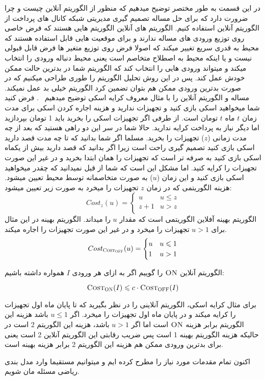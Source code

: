 در این قسمت به طور مختصر توضیح میدهیم که منظور از الگوریتم آنلاین چیست و چرا ضرورت دارد که برای حل مساله تصمیم گیری مدیریتی شبکه کانال های پرداخت از الگوریتم آنلاین استفاده کنیم. 
الگوریتم های آنلاین الگوریتم هایی هستند که فرض خاصی روی توزیع ورودی های مساله ندارند و برای موقعیت هایی قابل استفاده هستند که محیط به قدری سریع تغییر میکند که اصولا فرض روی توزیع متغیر ها فرض قابل قبولی نیست و یا اینکه محیط به اصطلاح متخاصم  است یعنی محیط دنباله ورودی را انتخاب میکند و میتواند ورودی هایی را انتخاب کند که الگوریتم شما در بدترین حالت ممکن خودش عمل کند. پس در این روش تحلیل الگوریتم را طوری طراحی میکنیم که در صورت بدترین ورودی ممکن هم بتوان تضمین کرد الگوریتم خیلی بد عمل نمیکند.
 مساله و الگوریتم آنلاین را با مثال معروف کرایه اسکی  توضیح میدهیم
~\cite{onlineTutorial}.
فرض کنید شما میخواهید اسکی بازی کنید و تجهیزات ندارید و هزینه اجاره کردن اسکی برای مدت زمان $t$ ماه $t$ تومان است. از طرفی اگر تجهیزات اسکی را بخرید باید 1 تومان بپردازید اما دیگر نیاز به پرداخت کرایه ندارید. حالا شما در سر این دو راهی هستید که بعد از چه مدت زمانی ($z$) تجهیزات را بخرید. مسلما اگر شما بدانید که تا چه مدت قصد دارید اسکی بازی کنید تصمیم گیری راحت است زیرا اگر بدانید که قصد دارید بیش از یکماه اسکی بازی کنید به صرفه تر است که تجهیزات را همان ابتدا بخرید و در غیر این صورت تجهیزات را کرایه کنید. 
اما مشکل این است که شما از قبل نمیدانید که چقدر میخواهید اسکی بازی کنید و این زمان  ($u$) به صورت متخاصمانه توسط محیط تعیین میشود.  هزینه الگوریتمی که در زمان $z$ تجهیزات را میخرد به صورت زیر تعیین میشود:
\begin{equation}
 Cost_z(u)=
    \begin{cases}
      u &  u \leq z\\
      z+1 & u > z\\
    \end{cases}       
\end{equation}
الگوریتم بهینه آفلاین
\off
 الگوریتمی است که مقدار $u$ را میداند. الگوریتم بهینه در این مثال برای 
$u > 1$
تجهیزات را میخرد و در غیر این صورت تجهیزات را اجاره میکند.
\begin{equation}
 Cost_{\textsc{Cost}_{\textsc{OFF}}}(u)=
    \begin{cases}
      u &  u \leqslant 1\\
      1 & u > 1\\
    \end{cases}       
\end{equation}

\begin{تعریف}
الگوریتم آنلاین $\textsc{ON}$
را  گوییم اگر به ازای هر ورودی $I$ همواره داشته باشیم:

$$\textsc{Cost}_{\textsc{ON}}(I) \leqslant c \cdot \textsc{Cost}_{\textsc{OFF}}(I) $$
\end{تعریف}
برای مثال کرایه اسکی، الگوریتم آنلاینی را در نظر بگیرید که تا پایان ماه اول تجهیزات را کرایه میکند و در پایان ماه اول تجهیزات را میخرد. اگر
$u \leq 1$
باشد هزینه این الگوریتم برابر هزینه 
$\textsc{ON}$
است اما اگر
$u > 1$
باشد، هزینه این الگوریتم 2 است در حالیکه هزینه الگوریتم بهینه 1 است پس ضریب رقابتی این الگوریتم آنلاین 2 است یعنی برای بدترین ورودی ممکن هم هزینه این الگوریتم 2 برابر هزینه بهینه است.

اکنون تمام مقدمات مورد نیاز را مطرح کرده ایم و میتوانیم مستقیما وارد مدل بندی ریاضی مسئله مان شویم.











